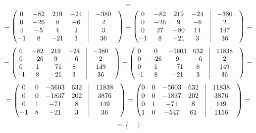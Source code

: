 \documentclass[a4paper,12pt]{article}
\begin{document}
\begin{enumerate}
\[=
\]
\[
=
\begin{pmatrix}
0 & -82 & 219 & -24 & \vrule &-380 & \\
0 & -26 & 9 & -6 & \vrule &2 & \\
4 & -5 & 4 & 2 & \vrule &3 & \\
-1 & 8 & -21 & 3 & \vrule &36 & \\
\end{pmatrix}
=
\begin{pmatrix}
0 & -82 & 219 & -24 & \vrule &-380 & \\
0 & -26 & 9 & -6 & \vrule &2 & \\
0 & 27 & -80 & 14 & \vrule &147 & \\
-1 & 8 & -21 & 3 & \vrule &36 & \\
\end{pmatrix}
=
\]
\[
=
\begin{pmatrix}
0 & -82 & 219 & -24 & \vrule &-380 & \\
0 & -26 & 9 & -6 & \vrule &2 & \\
0 & 1 & -71 & 8 & \vrule &149 & \\
-1 & 8 & -21 & 3 & \vrule &36 & \\
\end{pmatrix}
=
\begin{pmatrix}
0 & 0 & -5603 & 632 & \vrule &11838 & \\
0 & -26 & 9 & -6 & \vrule &2 & \\
0 & 1 & -71 & 8 & \vrule &149 & \\
-1 & 8 & -21 & 3 & \vrule &36 & \\
\end{pmatrix}
=
\]
\[
=
\begin{pmatrix}
0 & 0 & -5603 & 632 & \vrule &11838 & \\
0 & 0 & -1837 & 202 & \vrule &3876 & \\
0 & 1 & -71 & 8 & \vrule &149 & \\
-1 & 8 & -21 & 3 & \vrule &36 & \\
\end{pmatrix}
=
\begin{pmatrix}
0 & 0 & -5603 & 632 & \vrule &11838 & \\
0 & 0 & -1837 & 202 & \vrule &3876 & \\
0 & 1 & -71 & 8 & \vrule &149 & \\
1 & 0 & -547 & 61 & \vrule &1156 & \\
\end{pmatrix}
=
\]
\[
=
\begin{pmatrix}

\end{pmatrix}\]
\end{enumerate}
\end{document}
